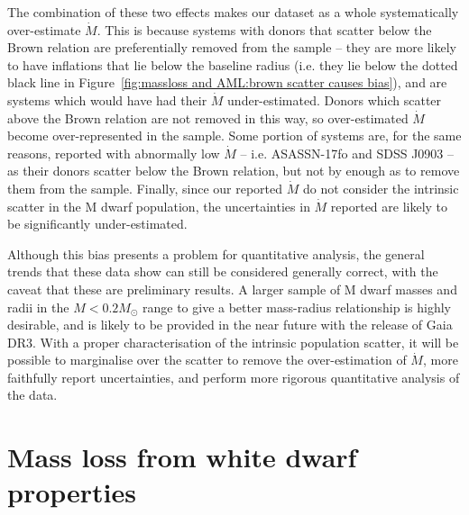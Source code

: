 The combination of these two effects makes our dataset as a whole systematically over-estimate $\dot M$. This is because systems with donors that scatter below the Brown relation are preferentially removed from the sample -- they are more likely to have inflations that lie below the baseline radius (i.e. they lie below the dotted black line in Figure~\ref{fig:massloss and AML:brown scatter causes bias}), and are systems which would have had their $\dot M$ under-estimated.
Donors which scatter above the Brown relation are not removed in this way, so over-estimated $\dot M$ become over-represented in the sample.
Some portion of systems are, for the same reasons, reported with abnormally low $\dot M$ -- i.e. ASASSN-17fo and SDSS J0903 -- as their donors scatter below the Brown relation, but not by enough as to remove them from the sample.
Finally, since our reported $\dot M$ do not consider the intrinsic scatter in the M dwarf population, the uncertainties in $\dot M$ reported are likely to be significantly under-estimated.

Although this bias presents a problem for quantitative analysis, the general trends that these data show can still be considered generally correct, with the caveat that these are preliminary results. A larger sample of M dwarf masses and radii in the $M < 0.2 M_\odot$ range to give a better mass-radius relationship is highly desirable, and is likely to be provided in the near future with the release of Gaia DR3.
With a proper characterisation of the intrinsic population scatter, it will be possible to marginalise over the scatter to remove the over-estimation of $\dot M$, more faithfully report uncertainties, and perform more rigorous quantitative analysis of the data.



\section{Mass loss from white dwarf properties}
\label{sect:modelling:white dwarf mass loss rates}



